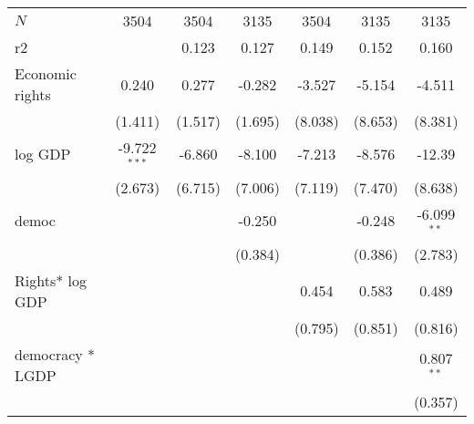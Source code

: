 \documentclass[9pt,letterpaper,subeqn]{beamer}
\begin{document}
\begin{frame}[label=placebo1]
\begin{table}[htbp]
\begin{tabular}{l*{6}{c}}
\hline
\(N\)       &        3504         &        3504         &        3135         &        3504         &        3135         &        3135         \\
r2          &                     &       0.123         &       0.127         &       0.149         &       0.152         &       0.160         \\
\hline\hline
Economic rights       &       0.240         &       0.277         &      -0.282         &      -3.527         &      -5.154         &      -4.511         \\
            &     (1.411)         &     (1.517)         &     (1.695)         &     (8.038)         &     (8.653)         &     (8.381)         \\

log GDP        &      -9.722$^{***}$&      -6.860         &      -8.100         &      -7.213         &      -8.576         &      -12.39         \\
            &     (2.673)         &     (6.715)         &     (7.006)         &     (7.119)         &     (7.470)         &     (8.638)         \\

democ       &                     &                     &      -0.250         &                     &      -0.248         &      -6.099$^{**}$ \\
            &                     &                     &     (0.384)         &                     &     (0.386)         &     (2.783)         \\

Rights* log GDP   &                     &                     &                     &       0.454         &       0.583         &       0.489         \\
            &                     &                     &                     &     (0.795)         &     (0.851)         &     (0.816)         \\

democracy * LGDP   &                     &                     &                     &                     &                     &       0.807$^{**}$ \\
            &                     &                     &                     &                     &                     &     (0.357)         \\


\end{tabular}
\end{table}
\end{frame}
\end{document}
